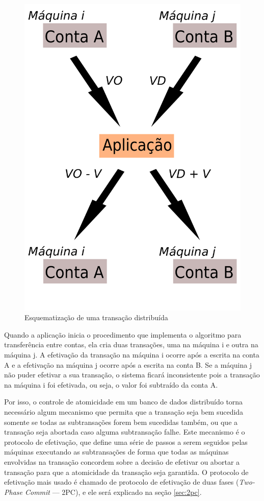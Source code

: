 \documentclass[11pt,twoside,a4paper]{book}
\begin{document}
\begin{figure}
  \centering
  \includegraphics[width=.40\textwidth]{transacao_distribuida} 
  \caption{Esquematização de uma transação distribuída}
  \label{fig:transacao_distribuida} 
\end{figure}


Quando a aplicação inicia o procedimento que implementa o algoritmo para transferência entre contas, ela cria duas transações, uma na máquina i e outra na máquina j. A efetivação da transação na máquina i ocorre após a escrita na conta A e a efetivação na máquina j ocorre após a escrita na conta B. Se a máquina j não puder efetivar a sua transação, o sistema ficará inconsistente pois a transação na máquina i foi efetivada, ou seja, o valor foi subtraído da conta A.

Por isso, o controle de atomicidade em um banco de dados distribuído torna necessário algum mecanismo que permita que a transação seja bem sucedida somente se todas as subtransações forem bem sucedidas também, ou que a transação seja abortada caso alguma subtransação falhe. Este mecanismo é o protocolo de efetivação, que define uma série de passos a serem seguidos pelas máquinas executando as subtransações de forma que todas as máquinas envolvidas na transação concordem sobre a decisão de efetivar ou abortar a transação para que a atomicidade da transação seja garantida. O protocolo de efetivação mais usado é chamado de protocolo de efetivação de duas fases (\emph{Two-Phase Commit} --- 2PC), e ele será explicado na seção \ref{sec:2pc}.
\end{document}
